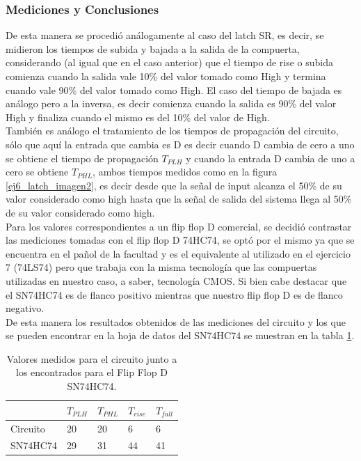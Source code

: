 \subsubsection{Mediciones y Conclusiones}
\noindent
De esta manera se procedió análogamente al caso del latch SR, es decir, se midieron los tiempos de subida y bajada a la salida de la compuerta, considerando (al igual que en el caso anterior) que el tiempo de rise o subida comienza cuando la salida vale 10\% del valor tomado como High y termina cuando vale 90\% del valor tomado como High. El caso del tiempo de bajada es análogo pero a la inversa, es decir comienza cuando la salida es 90\% del valor High y finaliza cuando el mismo es del 10\% del valor de High.\\
%
También es análogo el tratamiento de los tiempos de propagación del circuito, sólo que aquí la entrada que cambia es D es decir cuando D cambia de cero a uno se obtiene el tiempo de propagación $T_{PLH}$ y cuando la entrada D cambia de uno a cero se obtiene $T_{PHL}$, ambos tiempos medidos como en la figura \ref{ej6_latch_imagen2}, es decir desde que la señal de input alcanza el 50\% de su valor considerado como high hasta que la señal de salida del sistema llega al 50\% de su valor considerado como high.\\
%
Para los valores correspondientes a un flip flop D comercial, se decidió contrastar las mediciones tomadas con el flip flop D 74HC74, se optó por el mismo ya que se encuentra en el pañol de la facultad y es el equivalente al utilizado en el ejercicio 7 (74LS74) pero que trabaja con la misma tecnología que las compuertas utilizadas en nuestro caso, a saber, tecnología CMOS. Si bien cabe destacar que el SN74HC74 es de flanco positivo mientras que nuestro flip flop D es de flanco negativo.\\
De esta manera los resultados obtenidos de las mediciones del circuito y los que se pueden encontrar en la hoja de datos del SN74HC74 se muestran en la tabla \ref{ej6_tabla_flip_flop_mediciones}.
%
\begin{table}[H]
\caption{Valores medidos para el circuito junto a los encontrados para el Flip Flop D SN74HC74.}
\label{ej6_tabla_flip_flop_mediciones}
\centering
\begin{tabular}{|l||l|l|l|l|}
\hline
    & $T_{PLH}$ & $T_{PHL}$ & $T_{rise}$ & $T_{fall}$ \\ \hline \hline
Circuito & 20        & 20        & 6          & 6          \\ \hline
SN74HC74 & 29        & 31        & 44         & 41         \\ \hline
\end{tabular}
\end{table}
